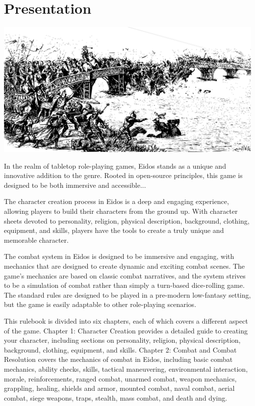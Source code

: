 \documentclass[12pt]{book}  %
\begin{document}
\tableofcontents

\chapter{Presentation}

\begin{center}
    \includegraphics[width=\textwidth]{./images/presentation01.pdf}
\end{center}


In the realm of tabletop role-playing games, Eidos stands as a unique and innovative addition to the genre. Rooted in open-source principles, this game is designed to be both immersive and accessible...

The character creation process in Eidos is a deep and engaging experience, allowing players to build their characters from the ground up. With character sheets devoted to personality, religion, physical description, background, clothing, equipment, and skills, players have the tools to create a truly unique and memorable character.

The combat system in Eidos is designed to be immersive and engaging, with mechanics that are designed to create dynamic and exciting combat scenes. The game's mechanics are based on classic combat narratives, and the system strives to be a simulation of combat rather than simply a turn-based dice-rolling game. The standard rules are designed to be played in a pre-modern low-fantasy setting, but the game is easily adaptable to other role-playing scenarios.

This rulebook is divided into six chapters, each of which covers a different aspect of the game. Chapter 1: Character Creation provides a detailed guide to creating your character, including sections on personality, religion, physical description, background, clothing, equipment, and skills. Chapter 2: Combat and Combat Resolution covers the mechanics of combat in Eidos, including basic combat mechanics, ability checks, skills, tactical maneuvering, environmental interaction, morale, reinforcements, ranged combat, unarmed combat, weapon mechanics, grappling, healing, shields and armor, mounted combat, naval combat, aerial combat, siege weapons, traps, stealth, mass combat, and death and dying.
\end{document}
